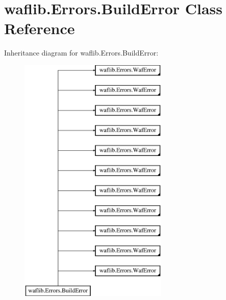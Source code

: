 \hypertarget{classwaflib_1_1_errors_1_1_build_error}{}\section{waflib.\+Errors.\+Build\+Error Class Reference}
\label{classwaflib_1_1_errors_1_1_build_error}
Inheritance diagram for waflib.\+Errors.\+Build\+Error\+:\begin{figure}[H]
\begin{center}
\leavevmode
\includegraphics[height=12.000000cm]{classwaflib_1_1_errors_1_1_build_error}
\end{center}
\end{figure}
